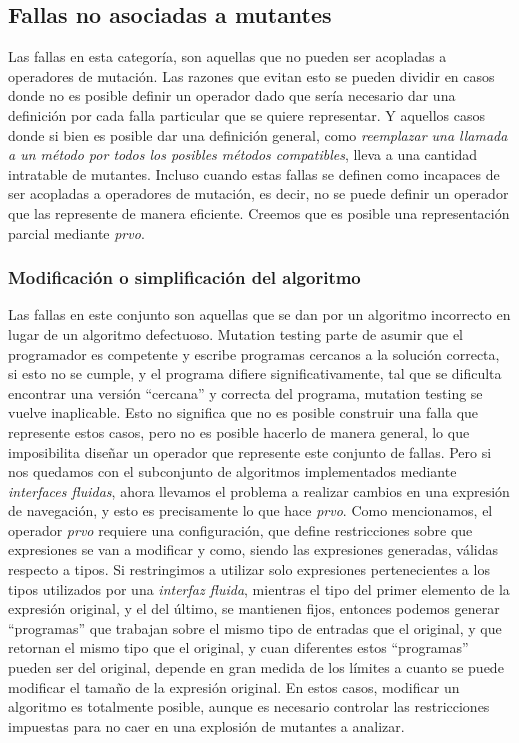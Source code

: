 \subsection{Fallas no asociadas a mutantes}

Las fallas en esta categor\'ia, son aquellas que no pueden ser acopladas a operadores de mutaci\'on. Las razones que evitan esto se pueden dividir en casos donde no es posible definir un operador dado que ser\'ia necesario dar una definici\'on por cada falla particular que se quiere representar. Y aquellos casos donde si bien es posible dar una definici\'on general, como \emph{reemplazar una llamada a un m\'etodo por todos los posibles m\'etodos compatibles}, lleva a una cantidad intratable de mutantes. Incluso cuando estas fallas se definen como incapaces de ser acopladas a operadores de mutaci\'on, es decir, no se puede definir un operador que las represente de manera eficiente. Creemos que es posible una representaci\'on parcial mediante \emph{prvo}.

\subsubsection{Modificaci\'on o simplificaci\'on del algoritmo}

Las fallas en este conjunto son aquellas que se dan por un algoritmo incorrecto en lugar de un algoritmo defectuoso. Mutation testing parte de asumir que el programador es competente y escribe programas cercanos a la soluci\'on correcta, si esto no se cumple, y el programa difiere significativamente, tal que se dificulta encontrar una versi\'on ``cercana'' y correcta del programa, mutation testing se vuelve inaplicable. Esto no significa que no es posible construir una falla que represente estos casos, pero no es posible hacerlo de manera general, lo que imposibilita dise\~nar un operador que represente este conjunto de fallas. Pero si nos quedamos con el subconjunto de algoritmos implementados mediante \emph{interfaces fluidas}, ahora llevamos el problema a realizar cambios en una expresi\'on de navegaci\'on, y esto es precisamente lo que hace \emph{prvo}. Como mencionamos, el operador \emph{prvo} requiere una configuraci\'on, que define restricciones sobre que expresiones se van a modificar y como, siendo las expresiones generadas, v\'alidas respecto a tipos. Si restringimos a utilizar solo expresiones pertenecientes a los tipos utilizados por una \emph{interfaz fluida}, mientras el tipo del primer elemento de la expresi\'on original, y el del \'ultimo, se mantienen fijos, entonces podemos generar ``programas'' que trabajan sobre el mismo tipo de entradas que el original, y que retornan el mismo tipo que el original, y cuan diferentes estos ``programas'' pueden ser del original, depende en gran medida de los l\'imites a cuanto se puede modificar el tama\~no de la expresi\'on original. En estos casos, modificar un algoritmo es totalmente posible, aunque es necesario controlar las restricciones impuestas para no caer en una explosi\'on de mutantes a analizar.

